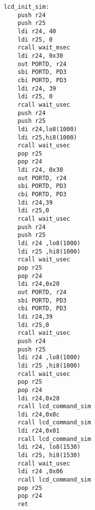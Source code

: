 \documentclass[11pt]{article}
\begin{document}
\begin{verbatim}
	lcd_init_sim:
        push r24
        push r25
        ldi r24, 40
        ldi r25, 0
        rcall wait_msec
        ldi r24, 0x30
        out PORTD, r24
        sbi PORTD, PD3
        cbi PORTD, PD3
        ldi r24, 39
        ldi r25, 0
        rcall wait_usec
        push r24
        push r25
        ldi r24,lo8(1000)
        ldi r25,hi8(1000)
        rcall wait_usec
        pop r25
        pop r24
        ldi r24, 0x30
        out PORTD, r24
        sbi PORTD, PD3
        cbi PORTD, PD3
        ldi r24,39
        ldi r25,0
        rcall wait_usec 
        push r24
        push r25
        ldi r24 ,lo8(1000)
        ldi r25 ,hi8(1000)
        rcall wait_usec
        pop r25
        pop r24
        ldi r24,0x20
        out PORTD, r24
        sbi PORTD, PD3
        cbi PORTD, PD3
        ldi r24,39
        ldi r25,0
        rcall wait_usec
        push r24
        push r25
        ldi r24 ,lo8(1000)
        ldi r25 ,hi8(1000)
        rcall wait_usec
        pop r25
        pop r24
        ldi r24,0x28
        rcall lcd_command_sim
        ldi r24,0x0c
        rcall lcd_command_sim
        ldi r24,0x01
        rcall lcd_command_sim
        ldi r24, lo8(1530)
        ldi r25, hi8(1530)
        rcall wait_usec
        ldi r24 ,0x06
        rcall lcd_command_sim
        pop r25
        pop r24
        ret

\end{verbatim}
\end{document}
